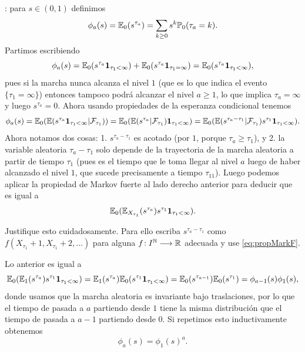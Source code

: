 : para $s\in(0,1)$ definimos
\begin{equation}\label{eq:phia}
\phi_a(s)=\mathbb{E}_0(s^{\tau_a})=\sum_{k\geq0}s^k\mathbb{P}_0(\tau_a=k).
\end{equation}
Partimos escribiendo
\[\phi_a(s)=\mathbb{E}_0(s^{\tau_a}\mathbf{1}_{\tau_1<\infty})+\mathbb{E}_0(s^{\tau_a}\mathbf{1}_{\tau_1=\infty})=\mathbb{E}_0(s^{\tau_a}\mathbf{1}_{\tau_1<\infty}),\]
pues si la marcha nunca alcanza el nivel $1$ (que es lo que indica el evento $\{\tau_1=\infty\}$) entonces tampoco podrá alcanzar el nivel $a\geq1$, lo que implica $\tau_a=\infty$ y luego $s^{\tau_a}=0$.
Ahora usando propiedades de la esperanza condicional tenemos
\[\phi_a(s)=\mathbb{E}_0(\mathbb{E}(s^{\tau_a}\mathbf{1}_{\tau_1<\infty}|\mathcal{F}_{\tau_1}))=\mathbb{E}_0(\mathbb{E}(s^{\tau_a}|\mathcal{F}_{\tau_1})\mathbf{1}_{\tau_1<\infty})=\mathbb{E}_0(\mathbb{E}(s^{\tau_a-\tau_1}|\mathcal{F}_{\tau_1})s^{\tau_1}\mathbf{1}_{\tau_1<\infty}).\]
Ahora notamos dos cosas: 1. $s^{\tau_a-\tau_1}$ es acotado (por $1$, porque $\tau_a\geq\tau_1$), y 2. la variable aleatoria $\tau_a-\tau_1$ solo depende de la trayectoria de la marcha aleatoria a partir de tiempo $\tau_1$ (pues es el tiempo que le toma llegar al nivel $a$ luego de haber alcanzado el nivel $1$, que sucede precisamente a tiempo $\tau_11$).
Luego podemos aplicar la propiedad de Markov fuerte al lado derecho anterior para deducir que es igual a
\[\mathbb{E}_0(\mathbb{E}_{X_{\tau_1}}(s^{\tau_a})s^{\tau_1}\mathbf{1}_{\tau_1<\infty}).\]

\begin{exer}
Justifique esto cuidadosamente.
Para ello escriba $s^{\tau_a-\tau_1}$ como $f(X_{\tau_1}+1,X_{\tau_1}+2,\dotsc)$ para alguna $f\!:I^{\mathbb{N}}\longrightarrow\mathbb{R}$ adecuada y use \eqref{eq:propMarkF}.
\end{exer}

Lo anterior es igual a
\[\mathbb{E}_0(\mathbb{E}_{1}(s^{\tau_a})s^{\tau_1}\mathbf{1}_{\tau_1<\infty})=\mathbb{E}_{1}(s^{\tau_a})\mathbb{E}_0(s^{\tau_1}\mathbf{1}_{\tau_1<\infty})=\mathbb{E}_{0}(s^{\tau_{a-1}})\mathbb{E}_0(s^{\tau_1})=\phi_{a-1}(s)\phi_1(s),\]
donde usamos que la marcha aleatoria es invariante bajo traslaciones, por lo que el tiempo de pasada a $a$ partiendo desde $1$ tiene la misma distribución que el tiempo de pasada a $a-1$ partiendo desde $0$.
Si repetimos esto inductivamente obtenemos 
\[\phi_a(s)=\phi_1(s)^a.\]


